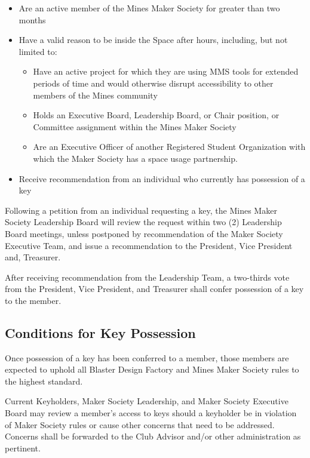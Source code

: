 \documentclass[12pt,letterpaper]{article}
\begin{document}
\begin{itemize}
    \item Are an active member of the Mines Maker Society for greater than two months
    \item Have a valid reason to be inside the Space after hours, including, but not limited to:
    \begin{itemize}
        \item Have an active project for which they are using MMS tools for extended periods of time and would otherwise disrupt accessibility to other members of the Mines community
        \item Holds an Executive Board, Leadership Board, or Chair position, or Committee assignment within the Mines Maker Society
        \item Are an Executive Officer of another Registered Student Organization with which the Maker Society has a space usage partnership.
    \end{itemize}
    \item Receive recommendation from an individual who currently has possession of a key
\end{itemize}

Following a petition from an individual requesting a key, the Mines Maker Society Leadership Board will review the request within two (2) Leadership Board meetings, unless postponed by recommendation of the Maker Society Executive Team, and issue a recommendation to the President, Vice President and, Treasurer.

After receiving recommendation from the Leadership Team, a two-thirds vote from the President, Vice President, and Treasurer shall confer possession of a key to the member.

\subsection{Conditions for Key Possession}

Once possession of a key has been conferred to a member, those members are expected to uphold all Blaster Design Factory and Mines Maker Society rules to the highest standard.

Current Keyholders, Maker Society Leadership, and Maker Society Executive Board may review a member’s access to keys should a keyholder be in violation of Maker Society rules or cause other concerns that need to be addressed. Concerns shall be forwarded to the Club Advisor and/or other administration as pertinent.
\end{document}
